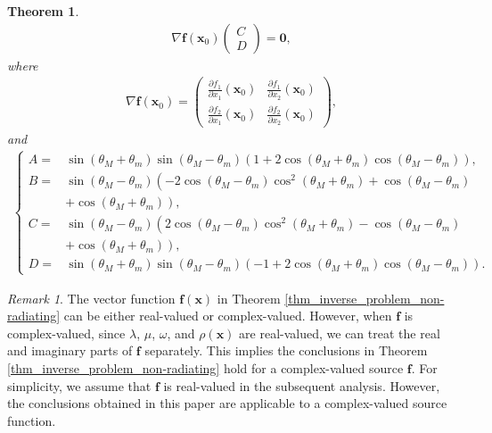 \documentclass[11pt,reqno,oneside]{amsart}
\newtheorem{theorem}{Theorem}[section]
\theoremstyle{definition}
\theoremstyle{remark}
\newtheorem{remark}{Remark}[section]
\numberwithin{equation}{section}
\numberwithin{equation}{section}
\theoremstyle{remark}
\begin{document}
\begin{theorem}
\begin{align}
		\nabla\mathbf{f}\left(\mathbf{x}_0\right)
		\begin{pmatrix}
			C \\ 
			D
		\end{pmatrix}
		=\mathbf{0},
	\end{align}
	where
	\begin{align*}
		\nabla\mathbf{f}\left(\mathbf{x}_0\right) = 
		\begin{pmatrix}
			\frac{\partial f_1}{\partial x_1}\left(\mathbf{x}_0\right) & \frac{\partial f_1}{\partial x_2}\left(\mathbf{x}_0\right) \\
			\frac{\partial f_2}{\partial x_1}\left(\mathbf{x}_0\right) & \frac{\partial f_2}{\partial x_2}\left(\mathbf{x}_0\right)
		\end{pmatrix},
	\end{align*}
	and 
	\begin{align} \label{def_thm_2_ABCD}
		\begin{cases}
			A=&\sin\left(\theta_M+\theta_m\right)\sin\left(\theta_M-\theta_m\right)\left(1+2\cos\left(\theta_M+\theta_m\right)\cos\left(\theta_M-\theta_m\right)\right), \\
			B=&\sin\left(\theta_M-\theta_m\right)\left(-2\cos\left(\theta_M-\theta_m\right)\cos^2\left(\theta_M+\theta_m\right)+\cos\left(\theta_M-\theta_m\right)\right. \\
			&\left.+\cos\left(\theta_M+\theta_m\right)\right), \\
			C=&\sin\left(\theta_M-\theta_m\right)\left(2\cos\left(\theta_M-\theta_m\right)\cos^2\left(\theta_M+\theta_m\right)-\cos\left(\theta_M-\theta_m\right)\right. \\
			&\left.+\cos\left(\theta_M+\theta_m\right)\right), \\
			D=&\sin\left(\theta_M+\theta_m\right)\sin\left(\theta_M-\theta_m\right)\left(-1+2\cos\left(\theta_M+\theta_m\right)\cos\left(\theta_M-\theta_m\right)\right).
		\end{cases}
	\end{align}
\end{theorem}

\begin{remark}
	The vector function $ \mathbf{f}\left(\mathbf{x}\right) $ in Theorem \ref{thm_inverse_problem_non-radiating} can be either real-valued or complex-valued. However, when $ \mathbf{f} $ is complex-valued, since $ \lambda $, $ \mu $, $ \omega $, and $ \rho\left(\mathbf{x}\right) $ are real-valued, we can treat   the real and imaginary parts of $ \mathbf{f} $ separately. This implies the conclusions in Theorem \ref{thm_inverse_problem_non-radiating} hold for a complex-valued source $\mathbf f$. For simplicity, we assume that $ \mathbf{f} $ is real-valued in the subsequent analysis. However, the conclusions obtained in this paper are applicable to a complex-valued source function. 
\end{remark}
\end{document}
